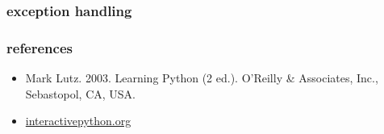 \documentclass{beamer}
\begin{document}
\begin{frame}
\frametitle{exception handling}
\framesubtitle{}
  
\end{frame}


%         




\begin{frame}
 \frametitle{references}
 \begin{itemize}
  \item Mark Lutz. 2003. Learning Python (2 ed.). O'Reilly \& Associates, Inc., Sebastopol, CA, USA.
  \item \href{http://interactivepython.org}{interactivepython.org}
 \end{itemize}
\end{frame}
\end{document}

